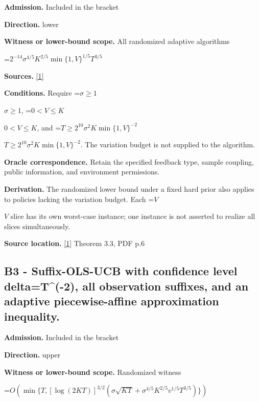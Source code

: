 \documentclass[10pt,a4paper]{article}
\newcommand{\AtlasMath}[1]{\par\begingroup\centering\setbox0=\hbox{$\displaystyle #1$}\ifdim\wd0>1.4\linewidth\typeout{ATLAS WIDE FORMULA: \the\wd0}\fi\ifdim\wd0>\linewidth\resizebox{\linewidth}{!}{\box0}\else\box0\fi\par\endgroup}
\newcommand{\AtlasInlineMath}[1]{\begingroup\setbox0=\hbox{$#1$}\ifdim\wd0>.4\linewidth\endgroup\AtlasMath{#1}\else\endgroup$#1$\fi}
\begin{document}
\textbf{Admission.} Included in the bracket



\textbf{Direction.} lower



\textbf{Witness or lower-bound scope.} All randomized adaptive algorithms



\AtlasMath{2^{-14}\sigma^{4/5}K^{2/5}\min\{1,V\}^{1/5}T^{3/5}}


\textbf{Sources.} \href{https://proceedings.nips.cc/paper_files/paper/2025/file/1aa670dafbd4b32ebf483f8372e612c5-Paper-Conference.pdf}{[1]}



\textbf{Conditions.} Require \AtlasInlineMath{\sigma\ge1}, \AtlasInlineMath{0<V\le K}, and \AtlasInlineMath{T\ge2^{10}\sigma^2K\min\{1,V\}^{-2}}. The variation budget is not supplied to the algorithm.



\textbf{Oracle correspondence.} Retain the specified feedback type, sample coupling, public information, and environment permissions.



\textbf{Derivation.} The randomized lower bound under a fixed hard prior also applies to policies lacking the variation budget. Each \AtlasInlineMath{V} slice has its own worst-case instance; one instance is not asserted to realize all slices simultaneously.



\textbf{Source location.} \href{https://proceedings.nips.cc/paper_files/paper/2025/file/1aa670dafbd4b32ebf483f8372e612c5-Paper-Conference.pdf}{[1]} Theorem 3.3, PDF p.6



\subsection{B3 - Suffix-OLS-UCB with confidence level delta=T\textasciicircum{}(-2), all observation suffixes, and an adaptive piecewise-affine approximation inequality.}


\textbf{Admission.} Included in the bracket



\textbf{Direction.} upper



\textbf{Witness or lower-bound scope.} Randomized witness



\AtlasMath{O\!\left(\min\{T,[\log(2KT)]^{3/2}(\sigma\sqrt{KT}+\sigma^{4/5}K^{2/5}v^{1/5}T^{3/5})\}\right)}
\end{document}
